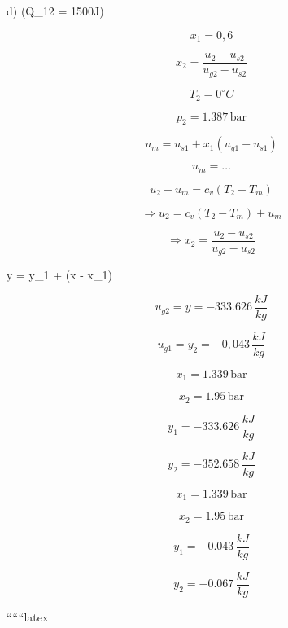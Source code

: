 d) \quad {} (Q_{12} = 1500J) 

\[
x_1 = 0,6
\]

\[
x_2 = \frac{u_2 - u_{s2}}{u_{g2} - u_{s2}}
\]

\[
T_2 = 0^\circ C
\]

\[
p_2 = 1.387 \, \text{bar}
\]

\[
u_m = u_{s1} + x_1 (u_{g1} - u_{s1})
\]


\[
u_m = \ldots
\]

\[
u_2 - u_m = c_v (T_2 - T_m)
\]

\[
\Rightarrow u_2 = c_v (T_2 - T_m) + u_m
\]

\[
\Rightarrow x_2 = \frac{u_2 - u_{s2}}{u_{g2} - u_{s2}}
\]

 y = y_1 +  (x - x_1)


\[
u_{g2} = y = -333.626 \, \frac{kJ}{kg}
\]

\[
u_{g1} = y_2 = -0,043 \, \frac{kJ}{kg}
\]


\[
x_1 = 1.339 \, \text{bar}
\]

\[
x_2 = 1.95 \, \text{bar}
\]

\[
y_1 = -333.626 \, \frac{kJ}{kg}
\]

\[
y_2 = -352.658 \, \frac{kJ}{kg}
\]

\[
x_1 = 1.339 \, \text{bar}
\]

\[
x_2 = 1.95 \, \text{bar}
\]

\[
y_1 = -0.043 \, \frac{kJ}{kg}
\]

\[
y_2 = -0.067 \, \frac{kJ}{kg}
\]

``````latex